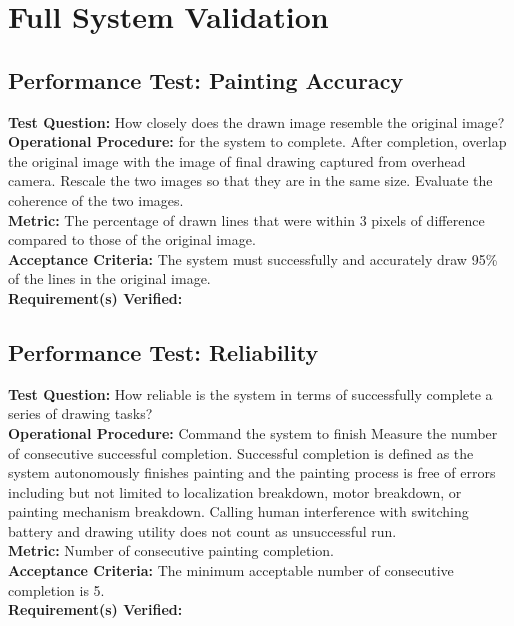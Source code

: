 
\section{Full System Validation}
\label{sec:system_validation}

\subsection{Performance Test: Painting Accuracy}
\label{test:sys_pt_accuracy}
\textbf{Test Question:} How closely does the drawn image resemble the original image?\\
\textbf{Operational Procedure:}  for the system to complete. After completion, overlap the original image with the image of final drawing captured from overhead camera. Rescale the two images so that they are in the same size. Evaluate the coherence of the two images.\\
\textbf{Metric:} The percentage of drawn lines that were within 3 pixels of difference compared to those of the original image.\\
\textbf{Acceptance Criteria:} The system must successfully and accurately draw 95\% of the lines in the original image.\\
\textbf{Requirement(s) Verified:} 

\subsection{Performance Test: Reliability}
\label{test:sys_pt_reliability}
\textbf{Test Question:} How reliable is the system in terms of successfully complete a series of drawing tasks?\\
\textbf{Operational Procedure:} Command the system to finish  Measure the number of consecutive successful completion. Successful completion is defined as the system autonomously finishes painting and the painting process is free of errors including but not limited to localization breakdown, motor breakdown, or painting mechanism breakdown. Calling human interference with switching battery and drawing utility does not count as unsuccessful run.\\
\textbf{Metric:} Number of consecutive painting completion. \\
\textbf{Acceptance Criteria:} The minimum acceptable number of consecutive completion is 5.\\
\textbf{Requirement(s) Verified:} 

